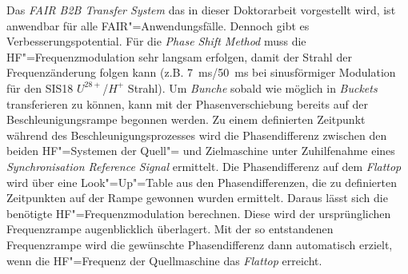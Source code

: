 Das \textit{FAIR B2B Transfer System} das in dieser Doktorarbeit vorgestellt wird, ist anwendbar f\"ur alle FAIR"=Anwendungsf\"alle. Dennoch gibt es Verbesserungspotential. F\"ur die \textit{Phase Shift Method} muss die HF"=Frequenzmodulation sehr langsam erfolgen, damit der Strahl der Frequenz\"anderung folgen kann (z.B. \SI{7}{\ms}/\SI{50}{\ms} bei sinusf\"ormiger Modulation für den SIS18 $U^\mathit{28+}$/$H^\mathit{+}$ Strahl). Um \textit{Bunche} sobald wie m\"oglich in \textit{Buckets} transferieren zu k\"onnen, kann mit der Phasenverschiebung bereits auf der Beschleunigungsrampe begonnen werden. Zu einem definierten Zeitpunkt w\"ahrend des Beschleunigungsprozesses wird die Phasendifferenz zwischen den beiden HF"=Systemen der Quell"= und Zielmaschine unter Zuhilfenahme eines \textit{Synchronisation Reference Signal} ermittelt. Die Phasendifferenz auf dem \textit{Flattop} wird \"uber eine Look"=Up"=Table aus den Phasendifferenzen, die zu definierten Zeitpunkten auf der Rampe gewonnen wurden ermittelt. Daraus l\"asst sich die ben\"otigte HF"=Frequenzmodulation berechnen. Diese wird der urspr\"unglichen Frequenzrampe augenblicklich \"uberlagert. Mit der so entstandenen Frequenzrampe wird die gew\"unschte Phasendifferenz dann automatisch erzielt, wenn die HF"=Frequenz der Quellmaschine das \textit{Flattop} erreicht.